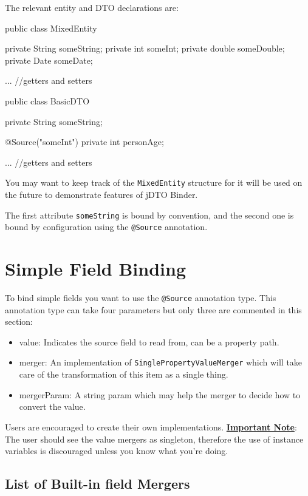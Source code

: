 \documentclass[11pt]{article}
\newcommand{\JDTO}{jDTO Binder\xspace}
\begin{document}
The relevant entity and DTO declarations are:


\begin{java}
 public class MixedEntity {
    private String someString;
    private int someInt;
    private double someDouble;
    private Date someDate;
    
    ... //getters and setters
}

public class BasicDTO {
    private String someString;
    
    @Source("someInt")
    private int personAge;
    
    ... //getters and setters
}
\end{java}

You may want to keep track of the \texttt{MixedEntity} structure for it will be used on the future
to demonstrate features of \JDTO.

The first attribute \texttt{someString} is bound by convention, and the second one is bound
by configuration using the \texttt{@Source} annotation.

\section{Simple Field Binding}


To bind simple fields you want to use the \texttt{@Source} annotation type.
This annotation type can take four parameters but only three are commented in this section:

\begin{itemize}
 \item value: Indicates the source field to read from, can be a property path.
 \item merger: An implementation of \texttt{SinglePropertyValueMerger} which will take care of the transformation of this item as a single thing.
 \item mergerParam: A string param which may help the merger to decide how to convert the value.
\end{itemize}

Users are encouraged to create their own implementations. \textbf{\underline{Important Note}}: The user should see
the value mergers as singleton, therefore the use of instance variables is discouraged unless you know what you're doing.


\subsection{List of Built-in field Mergers}
\end{document}
